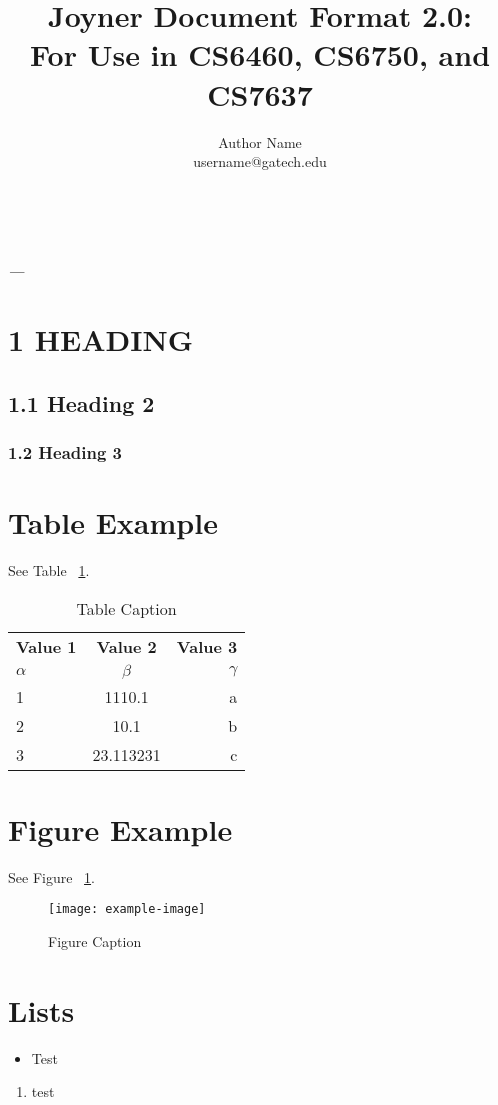 \documentclass[11pt,letterpaper]{article}
\makeatletter
\renewcommand{\maketitle}{\bgroup
   \begin{center}
   \begin{spacing}{2.0}
{\fontsize{17pt}{0}\selectfont \@title}\\
   \end{spacing}
   \vspace{4pt}
   {\fontsize{12pt}{0}\selectfont \@author} 
	
   \end{center}
}
\newenvironment{myquote}[1]%
  {\list{}{\leftmargin=#1\rightmargin=#1}\item[]}%
  {\endlist}
\renewenvironment{abstract}
{\vspace*{-.5in}\fontsize{12pt}{12}\begin{myquote}{.5in}
\noindent \par{\bfseries \itshape \abstractname ---}}
{\medskip\noindent
\end{myquote}
}
\makeatother
\begin{document}
\title{Joyner Document Format 2.0:\\
For Use in CS6460, CS6750, and CS7637
}
\author{Author Name \\ username@gatech.edu}

\maketitle

\begin{abstract}
\lipsum[8]
\end{abstract}

\section*{1 HEADING}
\lipsum[1]
\lipsum[3]

\subsection*{1.1 Heading 2}
\lipsum[2]

\subsubsection*{1.2 Heading 3}
\lipsum[3]

\section*{Table Example}
\lipsum[1] See Table ~\ref{table:1}.
\begin{table}[H]
  \begin{center}
    \caption{Table Caption}
    \label{table:1}
    \begin{tabular}{l|c|r}
      \textbf{Value 1} & \textbf{Value 2} & \textbf{Value 3}\\
      $\alpha$ & $\beta$ & $\gamma$ \\
      \hline
      1 & 1110.1 & a\\
      2 & 10.1 & b\\
      3 & 23.113231 & c\\
    \end{tabular}
  \end{center}
\end{table}

\section*{Figure Example}
\lipsum[1] See Figure ~\ref{fig::1}.
\begin{figure}[H]
\centering
\texttt{[image: example-image]}
\caption{Figure Caption}
\label{fig::1}
\end{figure}

\section*{Lists}
\begin{itemize}[leftmargin=.5in]
\item Test
\end{itemize}

\begin{enumerate}[leftmargin=.5in]
\item test \cite{einstein}
\end{enumerate}

 

\end{document}

